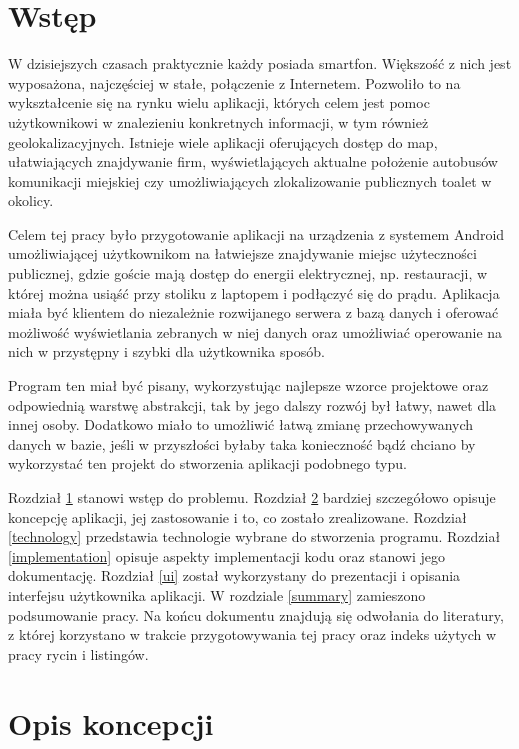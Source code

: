 \documentclass[polish,polish,a4paper,12pt]{article}
\let\sectioncmd\section
\renewcommand{\section}{\clearpage\sectioncmd}
\begin{document}
\tableofcontents

\pagestyle{plain}

\section{Wstęp}\label{preface}

W dzisiejszych czasach praktycznie każdy posiada smartfon. Większość z nich jest wyposażona, najczęściej w stałe, połączenie z Internetem. Pozwoliło to na wykształcenie się na rynku wielu aplikacji, których celem jest pomoc użytkownikowi w znalezieniu konkretnych informacji, w tym również geolokalizacyjnych. Istnieje wiele aplikacji oferujących dostęp do map, ułatwiających znajdywanie firm, wyświetlających aktualne położenie autobusów komunikacji miejskiej czy umożliwiających zlokalizowanie publicznych toalet w okolicy.

Celem tej pracy było przygotowanie aplikacji na urządzenia z systemem Android umożliwiającej użytkownikom na łatwiejsze znajdywanie miejsc użyteczności publicznej, gdzie goście mają dostęp do energii elektrycznej, np. restauracji, w której można usiąść przy stoliku z laptopem i podłączyć się do prądu. Aplikacja miała być klientem do niezależnie rozwijanego serwera z bazą danych i oferować możliwość wyświetlania zebranych w niej danych oraz umożliwiać operowanie na nich w przystępny i szybki dla użytkownika sposób.

Program ten miał być pisany, wykorzystując najlepsze wzorce projektowe oraz odpowiednią warstwę abstrakcji, tak by jego dalszy rozwój był łatwy, nawet dla innej osoby. Dodatkowo miało to umożliwić łatwą zmianę przechowywanych danych w bazie, jeśli w przyszłości byłaby taka konieczność bądź chciano by wykorzystać ten projekt do stworzenia aplikacji podobnego typu.

Rozdział \ref{preface} stanowi wstęp do problemu. Rozdział \ref{concept} bardziej szczegółowo opisuje koncepcję aplikacji, jej zastosowanie i to, co zostało zrealizowane. Rozdział \ref{technology} przedstawia technologie wybrane do stworzenia programu. Rozdział \ref{implementation} opisuje aspekty implementacji kodu oraz stanowi jego dokumentację. Rozdział \ref{ui} został wykorzystany do prezentacji i opisania interfejsu użytkownika aplikacji. W rozdziale \ref{summary} zamieszono podsumowanie pracy. Na końcu dokumentu znajdują się odwołania do literatury, z której korzystano w trakcie przygotowywania tej pracy oraz indeks użytych w pracy rycin i listingów.

\section{Opis koncepcji}\label{concept}
\end{document}
